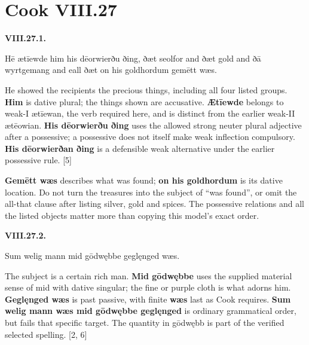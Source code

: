 \par\begin{minipage}{\linewidth}\raggedright
\section*{Cook VIII.27}
\textbf{VIII.27.1.}

Hē ætīewde him his dēorwierðu ðing, ðæt seolfor and ðæt gold and ðā wyrtgemang and eall ðæt on his goldhordum gemētt wæs.

He showed the recipients the precious things, including all four listed groups. \textbf{Him} is dative plural; the things shown are accusative. \textbf{Ætīewde} belongs to weak-I ætīewan, the verb required here, and is distinct from the earlier weak-II ætēowian. \textbf{His dēorwierðu ðing} uses the allowed strong neuter plural adjective after a possessive; a possessive does not itself make weak inflection compulsory. \textbf{His dēorwierðan ðing} is a defensible weak alternative under the earlier possessive rule. [5]

\textbf{Gemētt wæs} describes what was found; \textbf{on his goldhordum} is its dative location. Do not turn the treasures into the subject of “was found”, or omit the all-that clause after listing silver, gold and spices. The possessive relations and all the listed objects matter more than copying this model's exact order.

\end{minipage}\par\addvspace{4pt}

\par\begin{minipage}{\linewidth}\raggedright
\textbf{VIII.27.2.}

Sum welig mann mid gōdwębbe geglęnged wæs.

The subject is a certain rich man. \textbf{Mid gōdwębbe} uses the supplied material sense of mid with dative singular; the fine or purple cloth is what adorns him. \textbf{Geglęnged wæs} is past passive, with finite \textbf{wæs} last as Cook requires. \textbf{Sum welig mann wæs mid gōdwębbe geglęnged} is ordinary grammatical order, but fails that specific target. The quantity in gōdwębb is part of the verified selected spelling. [2, 6]

\end{minipage}\par\addvspace{4pt}

